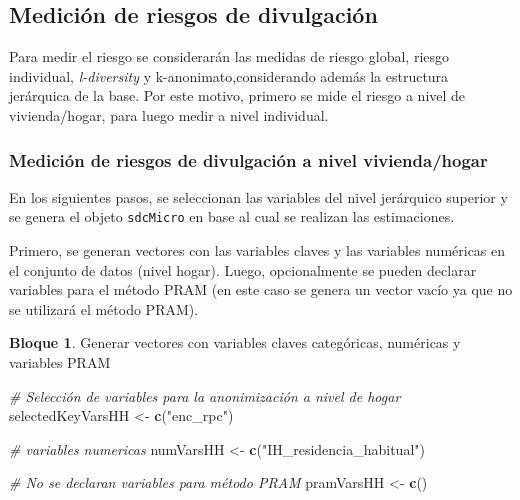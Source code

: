\documentclass[]{book}
\newenvironment{Shaded}{\begin{snugshade}}{\end{snugshade}}
\newcommand{\CommentTok}[1]{\textcolor[rgb]{0.56,0.35,0.01}{\textit{#1}}}
\newcommand{\KeywordTok}[1]{\textcolor[rgb]{0.13,0.29,0.53}{\textbf{#1}}}
\newcommand{\NormalTok}[1]{#1}
\newcommand{\StringTok}[1]{\textcolor[rgb]{0.31,0.60,0.02}{#1}}
\theoremstyle{definition}
\theoremstyle{definition}
\newtheorem{example}{Bloque}[chapter]
\theoremstyle{definition}
\theoremstyle{definition}
\theoremstyle{remark}
\begin{document}
\hypertarget{mediciuxf3n-de-riesgos-de-divulgaciuxf3n}{%
\subsection{Medición de riesgos de divulgación}\label{mediciuxf3n-de-riesgos-de-divulgaciuxf3n}}

Para medir el riesgo se considerarán las medidas de riesgo global, riesgo individual, \emph{l-diversity} y k-anonimato,considerando además la estructura jerárquica de la base. Por este motivo, primero se mide el riesgo a nivel de vivienda/hogar, para luego medir a nivel individual.

\hypertarget{mediciuxf3n-de-riesgos-de-divulgaciuxf3n-a-nivel-viviendahogar}{%
\subsubsection{Medición de riesgos de divulgación a nivel vivienda/hogar}\label{mediciuxf3n-de-riesgos-de-divulgaciuxf3n-a-nivel-viviendahogar}}

En los siguientes pasos, se seleccionan las variables del nivel jerárquico superior y se genera el objeto \texttt{sdcMicro} en base al cual se realizan las estimaciones.

Primero, se generan vectores con las variables claves y las variables numéricas en el conjunto de datos (nivel hogar). Luego, opcionalmente se pueden declarar variables para el método PRAM (en este caso se genera un vector vacío ya que no se utilizará el método PRAM).

\begin{example}
\protect\hypertarget{exm:bloque38nbm}{}{\label{exm:bloque38nbm} }Generar vectores con variables claves categóricas, numéricas y variables PRAM
\end{example}

\begin{Shaded}
\begin{Highlighting}[]
\CommentTok{# Selección de variables para la anonimización a nivel de hogar}
\NormalTok{selectedKeyVarsHH <-}\StringTok{ }\KeywordTok{c}\NormalTok{(}\StringTok{"enc_rpc"}\NormalTok{)}

\CommentTok{# variables numericas}
\NormalTok{numVarsHH <-}\StringTok{ }\KeywordTok{c}\NormalTok{(}\StringTok{"IH_residencia_habitual"}\NormalTok{)}

\CommentTok{# No se declaran variables para método PRAM}
\NormalTok{pramVarsHH <-}\StringTok{ }\KeywordTok{c}\NormalTok{()}
\end{Highlighting}
\end{Shaded}
\end{document}

